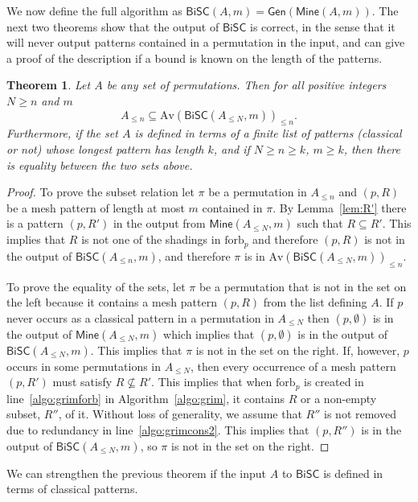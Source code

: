 \documentclass[a4paper]{article}
\newcommand{\gen}{\mathsf{Gen}}
\newcommand{\mine}{\mathsf{Mine}}
\newcommand{\bisc}{\mathsf{BiSC}}
\newcommand{\Av}{\mathrm{Av}}
\newcommand{\forb}{\mathrm{forb}}
\newtheorem{theorem}{Theorem}[section]
\begin{document}
We now define the full algorithm as $\bisc(A,m) = \gen(\mine(A,m))$. The next two theorems
show that the output of $\bisc$ is correct, in the sense that it will never
output patterns contained in a permutation in the input, and can give
a proof of the description if a bound is known on the length of the patterns.

\begin{theorem} \label{thm:biscMainThm}
  Let $A$ be any set of permutations. Then for all positive integers $N \geq n$ and $m$
  \[
    A_{\leq n} \subseteq \Av(\bisc(A_{\leq N},m))_{\leq n}.
  \]
  Furthermore, if the set $A$ is defined in terms of a finite list of patterns (classical or not)
  whose longest pattern has length $k$, and if $N \geq n \geq k$, $m \geq k$, then there is equality
  between the two sets above.
\end{theorem}

\begin{proof}
  To prove the subset relation let $\pi$ be a permutation in $A_{\leq n}$ and $(p,R)$ be a mesh pattern of length at most $m$
  contained in $\pi$. By Lemma~\ref{lem:R'} there is a pattern $(p,R')$ in the output from
  $\mine(A_{\leq N},m)$ such that $R \subseteq R'$.
  This implies that $R$ is not one of the shadings in $\forb_p$ and therefore $(p,R)$
  is not in the output of $\bisc(A_{\leq n},m)$, and therefore $\pi$ is in $\Av(\bisc(A_{\leq N},m))_{\leq n}$.
  
  To prove the equality of the sets, let $\pi$ be a permutation that is not in the set on the left because it contains
  a mesh pattern $(p, R)$ from the list defining $A$. If $p$ never occurs as a classical pattern in a
  permutation in $A_{\leq N}$ then $(p,\emptyset)$ is in the output of $\mine(A_{\leq N},m)$ which implies
  that $(p,\emptyset)$ is in the output of $\bisc(A_{\leq N},m)$. This implies that $\pi$ is not in the set
  on the right. If, however, $p$ occurs in some permutations in $A_{\leq N}$, then every occurrence of a mesh
  pattern $(p, R')$ must satisfy $R \nsubseteq R'$. This implies that when $\forb_p$ is created in
  line~\ref{algo:grimforb} in Algorithm~\ref{algo:grim}, it contains $R$ or a non-empty subset, $R''$, of it.
  Without loss of generality, we assume that $R''$ is not removed due to redundancy in line~\ref{algo:grimcons2}.
  This implies that $(p, R'')$ is in the output of $\bisc(A_{\leq N},m)$, so $\pi$ is not in the set on the right.
\end{proof}

We can strengthen the previous theorem if the input $A$ to $\bisc$ is defined in terms of classical patterns.
\end{document}
